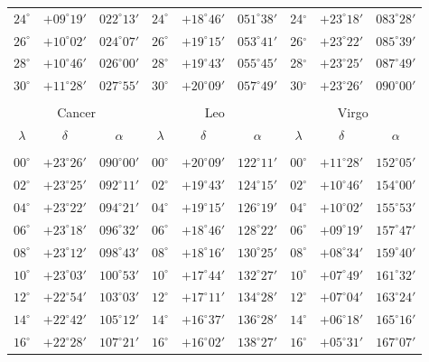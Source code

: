 \begin{table}[!h]
\begin{tabular}{ccc|ccc|ccc}
$24^\circ$ & $+09^\circ19'$ & $022^\circ13'$ & $24^\circ$ & $+18^\circ46'$ & $051^\circ38'$ & 24$^\circ$ & $+23^\circ18'$ & $083^\circ28'$\\
$26^\circ$ & $+10^\circ02'$ & $024^\circ07'$ & $26^\circ$ & $+19^\circ15'$ & $053^\circ41'$ & 26$^\circ$ & $+23^\circ22'$ & $085^\circ39'$\\
$28^\circ$ & $+10^\circ46'$ & $026^\circ00'$ & $28^\circ$ & $+19^\circ43'$ & $055^\circ45'$ & 28$^\circ$ & $+23^\circ25'$ & $087^\circ49'$\\
$30^\circ$ & $+11^\circ28'$ & $027^\circ55'$ & $30^\circ$ & $+20^\circ09'$ & $057^\circ49'$ & 30$^\circ$ & $+23^\circ26'$ & $090^\circ00'$\\
\multicolumn{9}{c}{}\\
\multicolumn{3}{c}{Cancer}\vline & \multicolumn{3}{c}{Leo} \vline& \multicolumn{3}{c}{Virgo}\\\hline
$\lambda$& $\delta$& $\alpha$& $\lambda$& $\delta$& $\alpha$& $\lambda$& $\delta$& $\alpha$\\\hline
&&&&&&&&\\[-2ex]
$00^\circ$ & $+23^\circ26'$ & $090^\circ00'$ & $00^\circ$ & $+20^\circ09'$ & $122^\circ11'$ & $00^\circ$ & $+11^\circ28'$ & $152^\circ05'$\\
$02^\circ$ & $+23^\circ25'$ & $092^\circ11'$ & $02^\circ$ & $+19^\circ43'$ & $124^\circ15'$ & $02^\circ$ & $+10^\circ46'$ & $154^\circ00'$\\
$04^\circ$ & $+23^\circ22'$ & $094^\circ21'$ & $04^\circ$ & $+19^\circ15'$ & $126^\circ19'$ & $04^\circ$ & $+10^\circ02'$ & $155^\circ53'$\\
$06^\circ$ & $+23^\circ18'$ & $096^\circ32'$ & $06^\circ$ & $+18^\circ46'$ & $128^\circ22'$ & $06^\circ$ & $+09^\circ19'$ & $157^\circ47'$\\
$08^\circ$ & $+23^\circ12'$ & $098^\circ43'$ & $08^\circ$ & $+18^\circ16'$ & $130^\circ25'$ & $08^\circ$ & $+08^\circ34'$ & $159^\circ40'$\\
$10^\circ$ & $+23^\circ03'$ & $100^\circ53'$ & $10^\circ$ & $+17^\circ44'$ & $132^\circ27'$ & $10^\circ$ & $+07^\circ49'$ & $161^\circ32'$\\
$12^\circ$ & $+22^\circ54'$ & $103^\circ03'$ & $12^\circ$ & $+17^\circ11'$ & $134^\circ28'$ & $12^\circ$ & $+07^\circ04'$ & $163^\circ24'$\\
$14^\circ$ & $+22^\circ42'$ & $105^\circ12'$ & $14^\circ$ & $+16^\circ37'$ & $136^\circ28'$ & $14^\circ$ & $+06^\circ18'$ & $165^\circ16'$\\
$16^\circ$ & $+22^\circ28'$ & $107^\circ21'$ & $16^\circ$ & $+16^\circ02'$ & $138^\circ27'$ & $16^\circ$ & $+05^\circ31'$ & $167^\circ07'$\\

\end{tabular}
\end{table}
